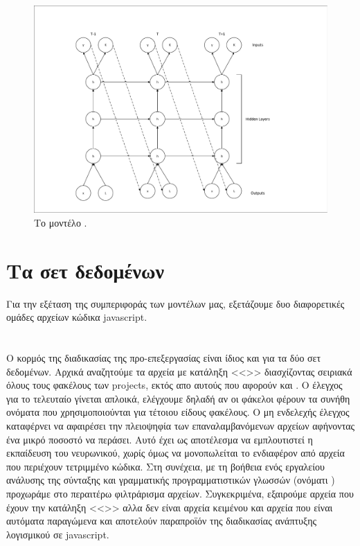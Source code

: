 \begin{figure}[h]
	\includegraphics[width=\textwidth, trim = 4 4 4 4, clip, keepaspectratio]{images/l-char-rnn.pdf}
	\centering 
	\caption{Το μοντέλο .}
	\label{fig:l-char-rnn}
\end{figure}

\section{Τα σετ δεδομένων}

Για την εξέταση της συμπεριφοράς των μοντέλων μας, εξετάζουμε δυο διαφορετικές ομάδες αρχείων κώδικα javascript. %

\section{}

Ο κορμός της διαδικασίας της προ-επεξεργασίας είναι ίδιος και για τα δύο σετ δεδομένων. 
Αρχικά αναζητούμε τα αρχεία με κατάληξη <<>> διασχίζοντας σειριακά όλους τους φακέλους των projects, εκτός απο αυτούς που αφορούν  και .
Ο έλεγχος για το τελευταίο γίνεται απλοικά, ελέγχουμε δηλαδή αν οι φάκελοι φέρουν τα συνήθη ονόματα που χρησιμοποιούνται για τέτοιου είδους φακέλους.
Ο μη ενδελεχής έλεγχος καταφέρνει να αφαιρέσει την πλειοψηφία των επαναλαμβανόμενων αρχείων αφήνοντας ένα μικρό ποσοστό να περάσει.
Αυτό έχει ως αποτέλεσμα να εμπλουτιστεί η εκπαίδευση του νευρωνικού, χωρίς όμως να μονοπωλείται το ενδιαφέρον από αρχεία που περιέχουν τετριμμένο κώδικα.
Στη συνέχεια, με τη βοήθεια ενός εργαλείου ανάλυσης της σύνταξης και γραμματικής προγραμματιστικών γλωσσών (ονόματι ) προχωράμε στο περαιτέρω φιλτράρισμα αρχείων.
Συγκεκριμένα, εξαιρούμε αρχεία που έχουν την κατάληξη <<>> αλλα δεν είναι αρχεία κειμένου και αρχεία που είναι αυτόματα παραγώμενα και αποτελούν παραπροϊόν της διαδικασίας ανάπτυξης λογισμικού σε javascript.

